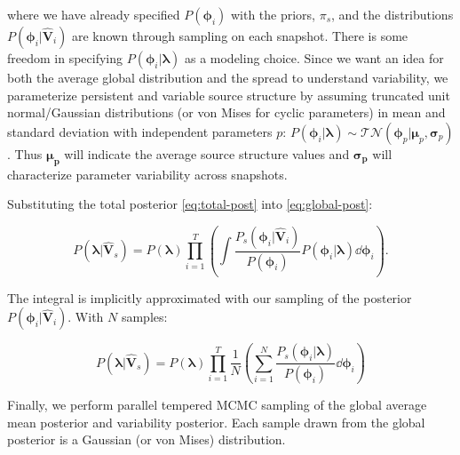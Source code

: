 \documentclass[linenumbers, twocolumn, tighten]{aastex701}
\begin{document}
where we have already specified $P(\boldsymbol{\phi}_i)$ with the priors, $\pi_s$, and the distributions $P(\boldsymbol{\phi}_i | \boldsymbol{\hat{V}}_i)$ are known through sampling on each snapshot. There is some freedom in specifying $P(\boldsymbol{\phi}_i|\boldsymbol{\lambda})$ as a modeling choice. Since we want an idea for both the average global distribution and the spread to understand variability, we parameterize persistent and variable source structure by assuming truncated unit normal/Gaussian distributions (or von Mises for cyclic parameters) in mean and standard deviation with independent parameters $p$: $P(\boldsymbol{\phi}_i|\boldsymbol{\lambda}) \sim \mathcal{TN}(\boldsymbol{\phi}_p | \boldsymbol{\mu}_p, \boldsymbol{\sigma}_p)$. Thus $\boldsymbol{\mu_p}$ will indicate the average source structure values and $\boldsymbol{\sigma_p}$ will characterize parameter variability across snapshots.


Substituting the total posterior \autoref{eq:total-post} into \autoref{eq:global-post}:

\begin{equation}
    P(\boldsymbol{\lambda} | \boldsymbol{\hat{V}}_{s}) = P(\boldsymbol{\lambda}) \prod_{i=1}^T \left( \int \frac{P_s(\boldsymbol{\phi}_i | \boldsymbol{\hat{V}}_i)}{P(\boldsymbol{\phi}_i)}P(\boldsymbol{\phi}_i | \boldsymbol{\lambda}) \dd{\boldsymbol{\phi}_i} \right).
\end{equation}

The integral is implicitly approximated with our sampling of the posterior $P(\boldsymbol{\phi}_i | \boldsymbol{\hat{V}}_i)$. With $N$ samples:

\begin{equation}
    P(\boldsymbol{\lambda} | \boldsymbol{\hat{V}}_{s}) = P(\boldsymbol{\lambda}) \prod_{i=1}^T \frac{1}{N} \left( \sum_{i=1}^N \frac{P_s(\boldsymbol{\phi}_i | \boldsymbol{\lambda})}{P(\boldsymbol{\phi}_i)} \dd{\boldsymbol{\phi}_i} \right)
\end{equation}

Finally, we perform parallel tempered MCMC sampling of the global average mean posterior and variability posterior. Each sample drawn from the global posterior is a Gaussian (or von Mises) distribution.
\end{document}
